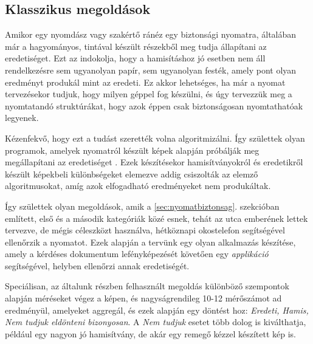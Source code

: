 \subsection{Klasszikus megoldások}

Amikor egy nyomdász vagy szakértő ránéz egy biztonsági nyomatra, 
általában már a hagyományos, tintával készült részekből meg tudja
állapítani az eredetiséget. Ezt az indokolja, hogy a hamisításhoz jó esetben nem áll 
rendelkezésre sem ugyanolyan papír, sem ugyanolyan festék,
amely pont olyan eredményt produkál mint az eredeti.
Ez akkor lehetséges, ha már a nyomat tervezésekor tudjuk, hogy
milyen géppel fog készülni, és úgy tervezzük meg a nyomtatandó struktúrákat,
hogy azok éppen csak biztonságosan nyomtathatóak legyenek.


Kézenfekvő, hogy ezt a tudást szerették volna algoritmizálni. Így születtek olyan
programok, amelyek nyomatról készült képek alapján próbálják meg megállapítani
az eredetiséget \cite{yeh2011employing}. Ezek készítésekor hamisítványokról és eredetikről készült
képekbeli különbségeket elemezve addig csiszolták az elemző algoritmusokat,
amíg azok elfogadható eredményeket nem produkáltak.

%


Így születtek olyan megoldások, amik a \ref{sec:nyomatbiztonsag}. 
szekcióban említett, első és a második kategóriák közé esnek, tehát az utca emberének lettek tervezve, 
de mégis céleszközt használva, hétköznapi okostelefon segítségével ellenőrzik a nyomatot.
Ezek alapján a tervünk egy olyan alkalmazás készítése, amely a kérdéses dokumentum
lefényképezését követően egy \textit{applikáció} segítségével, helyben ellenőrzi annak eredetiségét.


Speciálisan, az általunk részben felhasznált megoldás különböző szempontok alapján méréseket
végez a képen, és nagyságrendileg 10-12 mérőszámot ad eredményül, amelyeket
aggregál, és ezek alapján egy döntést hoz: \textit{Eredeti, Hamis, Nem tudjuk eldönteni bizonyosan}. A \textit{Nem tudjuk} esetet több dolog is kiválthatja, például egy nagyon jó hamisítvány, de akár egy remegő kézzel készített kép is.

